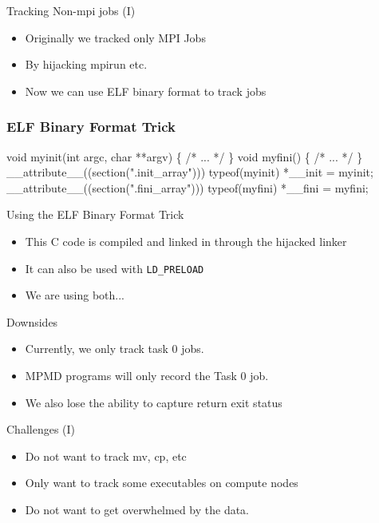 \documentclass{beamer}
\begin{document}
\begin{frame}{Tracking Non-mpi jobs (I)}
  \begin{itemize}
    \item Originally we tracked only MPI Jobs
    \item By hijacking mpirun etc.
    \item Now we can use ELF binary format to track jobs
  \end{itemize}
\end{frame}

\begin{frame}[fragile]
    \frametitle{ELF Binary Format Trick}
 {\small
    \begin{semiverbatim}
void myinit(int argc, char **argv)
\{
  /* ... */
\}
void myfini()
\{
  /* ... */
\}
  __attribute__((section(".init_array")))
       typeof(myinit) *__init = myinit;
  __attribute__((section(".fini_array")))
       typeof(myfini) *__fini = myfini;
    \end{semiverbatim}
}
\end{frame}

\begin{frame}{Using the ELF Binary Format Trick}
  \begin{itemize}
    \item This C code is compiled and linked in through the hijacked linker
    \item It can also be used with \texttt{LD\_PRELOAD}
    \item We are using both...
  \end{itemize}
\end{frame}

\begin{frame}{Downsides}
  \begin{itemize}
    \item Currently, we only track task 0 jobs.
    \item MPMD programs will only record the Task 0 job.
    \item We also lose the ability to capture return exit status
  \end{itemize}
\end{frame}

\begin{frame}{Challenges (I)}
  \begin{itemize}
    \item Do not want to track mv, cp, etc
    \item Only want to track some executables on compute nodes
    \item Do not want to get overwhelmed by the data. 
  \end{itemize}
\end{frame}
\end{document}
